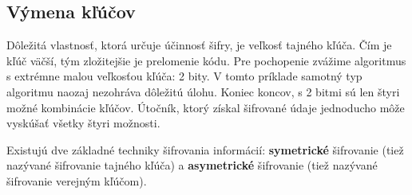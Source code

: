 \subsection{Výmena kľúčov}
Dôležitá vlastnosť, ktorá určuje účinnosť šifry, je veľkosť tajného kľúča. Čím je kľúč väčší, tým zložitejšie je prelomenie kódu. Pre pochopenie zvážime algoritmus s extrémne malou veľkosťou kľúča: 2 bity. V tomto príklade samotný typ algoritmu naozaj nezohráva dôležitú úlohu. Koniec koncov, s 2 bitmi sú len štyri možné kombinácie kľúčov. Útočník, ktorý získal šifrované údaje jednoducho môže vyskúšať všetky štyri možnosti.

Existujú dve základné techniky šifrovania informácií: \textbf{symetrické} šifrovanie (tiež nazývané šifrovanie tajného kľúča) a \textbf{asymetrické} šifrovanie (tiež nazývané šifrovanie verejným kľúčom). 

